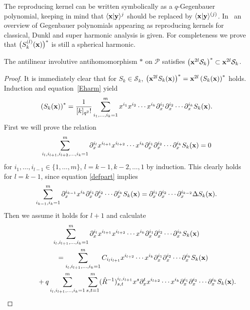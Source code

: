 \documentclass[pdftex]{sigma}
\newcommand{\cP}{\mathcal{P}}
\newcommand{\cS}{\mathcal{S}}
\numberwithin{equation}{section}
\begin{document}
The reproducing kernel can be written symbolically as a $q$-Gegenbauer polynomial, keeping in mind that $\langle \bold{x}|\bold{y}\rangle^j$ should be replaced by $\langle \bold{x}|\bold{y}\rangle^{(j)}$. In~\cite{CDBS2} an overview of Gegenbauer polynomials appearing as reproducing kernels for classical, Dunkl and super harmonic analysis is given. For completeness we prove that $\big(S_k^{(l)}(\bold{x})\big)^\ast$ is still a spherical harmonic.

\begin{lemma}
\label{Sast}
The antilinear involutive antihomomorphism $\ast$ on $\cP$ satisfies $\left(\bold{x}^{2l}\cS_k\right)^\ast\subset \bold{x}^{2l}\cS_k$.
\end{lemma}

\begin{proof}
It is immediately clear that for $S_k\in\cS_k$, $\left(\bold{x}^{2l}S_k(\bold{x})\right)^\ast=\bold{x}^{2l}\left(S_k(\bold{x})\right)^\ast$ holds. Induction and equation~\eqref{Eharm} yield
\begin{gather*}
\left(S_k(\bold{x})\right)^\ast =  \frac{1}{[k]_{q^2}!}\sum_{i_1,\dots,i_k=1}^{m}x^{i_1}x^{i_2}\cdots x^{i_k}\partial^{i_1}_x\partial^{i_2}_x\cdots\partial^{i_k}_xS_k(\bold{x}).
\end{gather*}
First we will prove the relation
\begin{gather}
\label{tssvgl}
\sum_{i_l,i_{l+1},i_{l+2},\dots,i_k=1}^m\partial^{i_l}_x x^{i_{l+1}}x^{i_{l+2}}\cdots x^{i_k}\partial^{i_1}_x\partial^{i_2}_x
\cdots\partial^{i_k}_xS_k(\bold{x})=0
\end{gather}
for $i_1,\dots, i_{l-1}\in\{1,\dots,m\}$, $l=k-1,k-2,\dots,1$ by induction. This clearly holds for $l=k-1$, since equation \eqref{defpart} implies
\begin{gather*}
\sum_{i_{k-1},i_{k}=1}^m\partial^{i_{k-1}}_x x^{i_k}\partial^{i_1}_x\partial^{i_2}_x\cdots\partial^{i_k}_xS_k(\bold{x}) = \partial^{i_1}_x\partial^{i_2}_x\cdots\partial^{i_{k-2}}_x\Delta S_k(\bold{x}).
\end{gather*}
Then we assume it holds for $l+1$ and calculate
\begin{gather*}
 \sum_{i_{l},i_{l+1},\dots,i_k=1}^m\partial^{i_l}_x x^{i_{l+1}}x^{i_{l+2}}\cdots x^{i_k}\partial^{i_1}_x\partial^{i_2}_x\cdots\partial^{i_k}_xS_k(\bold{x})\\
\qquad = \sum_{i_{l},i_{l+1},\dots,i_k=1}^mC_{i_{l}i_{l+1}}x^{i_{l+2}}\cdots x^{i_k}\partial^{i_1}_x\partial^{i_2}_x\cdots\partial^{i_k}_xS_k(\bold{x})\\
\qquad\quad{} + q\sum_{i_{l},i_{l+1},\dots,i_k=1}^m\sum_{s,t=1}^m(\hat{R}^{-1})^{i_l,i_{l+1}}_{s,t}x^s\partial^{t}_x x^{i_{l+2}}\cdots x^{i_k}\partial^{i_1}_x\partial^{i_2}_x\cdots\partial^{i_k}_xS_k(\bold{x}).

\end{gather*}
\end{proof}
\end{document}
